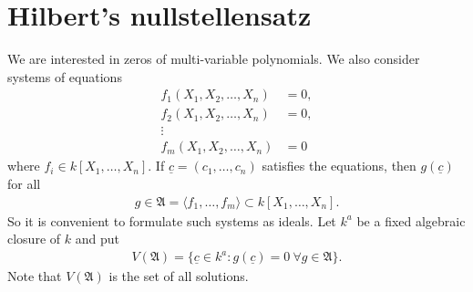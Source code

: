 \documentclass[12pt]{report}
\theoremstyle{plain}
\theoremstyle{remark}
\theoremstyle{definition}
\begin{document}
\section{Hilbert’s nullstellensatz}
We are interested in zeros of multi-variable polynomials. We also consider systems of equations
\begin{align*}
    f_1(X_1,X_2,\dots,X_n)&=0, \\
    f_2(X_1,X_2,\dots,X_n)&=0, \\
    \vdots \\
    f_m(X_1,X_2,\dots,X_n)&=0
\end{align*}
where $f_i\in k[X_1,\dots,X_n]$. If $\underline{c}=(c_1,\dots,c_n)$ satisfies the equations, then $g(\underline{c})$ for all
\begin{align*}
    g\in \mathfrak{A}=\langle f_1,\dots,f_m\rangle \subset k[X_1,\dots,X_n].
\end{align*}
So it is convenient to formulate such systems as ideals. Let $k^a$ be a fixed algebraic closure of $k$ and put
\begin{align*}
    V(\mathfrak{A})=\{\underline{c}\in k^a:g(\underline{c})=0\ \forall g\in\mathfrak{A}\}.
\end{align*}
Note that $V(\mathfrak{A})$ is the set of all solutions.
\end{document}
